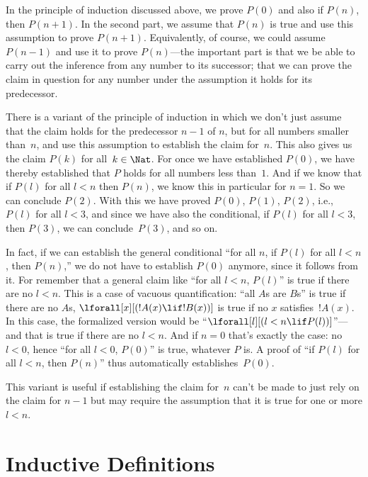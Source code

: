 \documentclass[../../../include/open-logic-section]{subfiles}
\begin{document}
In the principle of induction discussed above, we prove $P(0)$ and
also if $P(n)$, then $P(n+1)$.  In the second part, we assume that
$P(n)$ is true and use this assumption to prove $P(n+1)$.
Equivalently, of course, we could assume $P(n-1)$ and use it to prove
$P(n)$---the important part is that we be able to carry out the
inference from any number to its successor; that we can prove the
claim in question for any number under the assumption it holds for its
predecessor.

There is a variant of the principle of induction in which we don't
just assume that the claim holds for the predecessor $n-1$ of $n$, but
for all numbers smaller than~$n$, and use this assumption to establish
the claim for~$n$. This also gives us the claim $P(k)$ for all~$k \in
\Nat$.  For once we have established $P(0)$, we have thereby
established that $P$ holds for all numbers less than~$1$.  And if we
know that if $P(l)$ for all $l<n$ then $P(n)$, we know this in
particular for $n=1$.  So we can conclude $P(2)$.  With this we have
proved $P(0)$, $P(1)$, $P(2)$, i.e., $P(l)$ for all $l<3$, and since
we have also the conditional, if $P(l)$ for all $l<3$, then $P(3)$, we
can conclude~$P(3)$, and so on.

In fact, if we can establish the general conditional ``for all $n$, if
$P(l)$ for all $l<n$, then $P(n)$,'' we do not have to establish
$P(0)$ anymore, since it follows from it.  For remember that a general
claim like ``for all $l<n$, $P(l)$'' is true if there are no $l<n$.
This is a case of vacuous quantification: ``all $A$s are $B$s'' is
true if there are no $A$s, $\lforall[x][(!A(x) \lif !B(x))]$ is true
if no $x$ satisfies~$!A(x)$. In this case, the formalized version
would be ``$\lforall[l][(l < n \lif P(l))]$''---and that is true if
there are no $l < n$.  And if $n=0$ that's exactly the case: no $l<0$,
hence ``for all $l<0$, $P(0)$'' is true, whatever $P$ is.  A proof of
``if $P(l)$ for all $l<n$, then $P(n)$'' thus automatically
establishes~$P(0)$.

This variant is useful if establishing the claim for~$n$ can't be made
to just rely on the claim for $n-1$ but may require the assumption
that it is true for one or more $l<n$.  

\section{Inductive Definitions}
\end{document}
